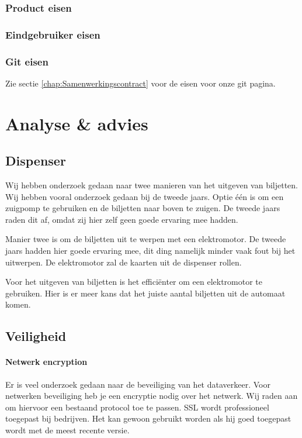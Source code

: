 \documentclass{article}
\begin{document}
\subsubsection{Product eisen}
\subsubsection{Eindgebruiker eisen}
\subsubsection{Git eisen}

Zie sectie \ref{chap:Samenwerkingscontract} voor de eisen voor onze git pagina.



\section{Analyse \& advies}

\subsection{Dispenser}

Wij hebben onderzoek gedaan naar twee manieren van het uitgeven van biljetten.
Wij hebben vooral onderzoek gedaan bij de tweede jaars.
Optie \'e\'en is om een zuigpomp te gebruiken en de biljetten naar boven te zuigen.
De tweede jaars raden dit af, omdat zij hier zelf geen goede ervaring mee hadden.

Manier twee is om de biljetten uit te werpen met een elektromotor.
De tweede jaars hadden hier goede ervaring mee, dit ding namelijk minder vaak fout bij het uitwerpen.
De elektromotor zal de kaarten uit de dispenser rollen.

Voor het uitgeven van biljetten is het effici\"enter om een elektromotor te gebruiken.
Hier is er meer kans dat het juiste aantal biljetten uit de automaat komen.

\newpage

\subsection{Veiligheid}

\paragraph{Netwerk encryption}

Er is veel onderzoek gedaan naar de beveiliging van het dataverkeer.
Voor netwerken beveiliging heb je een encryptie nodig over het netwerk.
Wij raden aan om hiervoor een bestaand protocol toe te passen.
SSL wordt professioneel toegepast bij bedrijven.
Het kan gewoon gebruikt worden als hij goed toegepast wordt met de meest recente versie.
\end{document}
